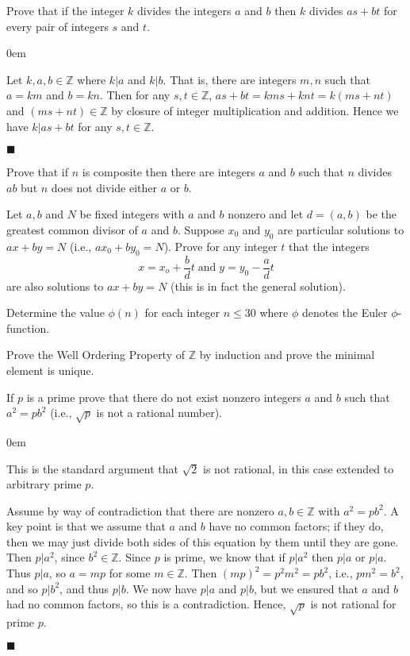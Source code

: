 \documentclass[12pt]{article}
\renewcommand{\qed}{\hfill$\blacksquare$}
\renewenvironment{proof}{\begin{addmargin}[1em]{0em}\begin{newproof}}{\end{newproof}\end{addmargin}\qed}
\newenvironment{problem}[2][Exercise]{\begin{trivlist}
\item[\hskip \labelsep {\bfseries #1}\hskip \labelsep {\bfseries #2.}]}{\end{trivlist}}
\begin{document}
\begin{problem}{0.2.2}
Prove that if the integer $k$ divides the integers $a$ and $b$ then $k$ divides $as+bt$ for every pair of integers $s$ and $t$.
\end{problem}
\begin{proof}
Let $k,a,b\in \mathbb{Z}$ where $k|a$ and $k|b$. That is, there are integers $m,n$ such that $a=km$ and $b=kn$. Then for any $s,t\in \mathbb{Z}$, $as+bt = kms+knt=k\left(ms+nt\right)$ and $\left(ms+nt\right)\in \mathbb{Z}$ by closure of integer multiplication and addition. Hence we have $k|as+bt$ for any $s,t\in \mathbb{Z}$.
\end{proof}




\begin{problem}{0.2.3}
Prove that if $n$ is composite then there are integers $a$ and $b$ such that $n$ divides $ab$ but $n$ does not divide either $a$ or $b$.
\end{problem}


\begin{problem}{0.2.4}
Let $a,b$ and $N$ be fixed integers with $a$ and $b$ nonzero and let $d=\left(a,b\right)$ be the greatest common divisor of $a$ and $b$. Suppose $x_0$ and $y_0$ are particular solutions to $ax+by=N$ (i.e., $ax_0+by_0=N$). Prove for any integer $t$ that the integers
$$ x=x_o + \frac{b}{d}t \; \text{and} \; y=y_0-\frac{a}{d}t $$
are also solutions to $ax+by=N$ (this is in fact the general solution).
\end{problem}


\begin{problem}{0.2.5}
Determine the value $\phi\left(n\right)$ for each integer $n\leq 30$ where $\phi$ denotes the Euler $\phi$-function.
\end{problem}


\begin{problem}{0.2.6}
Prove the Well Ordering Property of $\mathbb{Z}$ by induction and prove the minimal element is unique.
\end{problem}


\begin{problem}{0.2.7}
If $p$ is a prime prove that there do not exist nonzero integers $a$ and $b$ such that $a^2=pb^2$ (i.e., $\sqrt{p}$ is not a rational number).
\end{problem}
\begin{proof}
This is the standard argument that $\sqrt{2}$ is not rational, in this case extended to arbitrary prime $p$.

Assume by way of contradiction that there are nonzero $a,b\in \mathbb{Z}$ with $a^2 = pb^2$. A key point is that we assume that $a$ and $b$ have no common factors; if they do, then we may just divide both sides of this equation by them until they are gone. Then $p|a^2$, since $b^2 \in \mathbb{Z}$. Since $p$ is prime, we know that if $p|a^2$ then $p|a$ or $p|a$. Thus $p|a$, so $a=mp$ for some $m\in \mathbb{Z}$. Then $\left(mp\right)^2 = p^2 m^2 = pb^2$, i.e., $pm^2 = b^2$, and so $p|b^2$, and thus $p|b$. We now have $p|a$ and $p|b$, but we ensured that $a$ and $b$ had no common factors, so this is a contradiction. Hence, $\sqrt{p}$ is not rational for prime $p$.
\end{proof}
\end{document}
